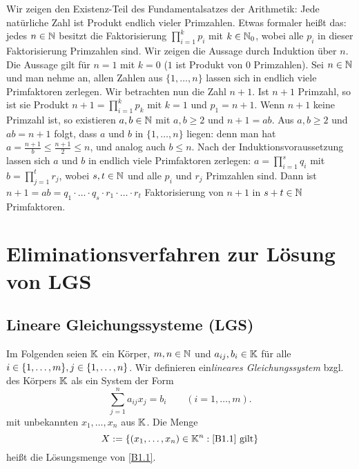 \begin{appendices}
\begin{bsp}
	Wir zeigen den Existenz-Teil des Fundamentalsatzes der Arithmetik: Jede natürliche Zahl ist Produkt endlich vieler Primzahlen.  Etwas formaler heißt das: jedes $n \in \mathbb N$ besitzt die Faktorisierung $\prod_{i=1}^k p_i$ mit $k \in \mathbb N_0$, wobei alle $p_i$ in dieser Faktorisierung Primzahlen sind. Wir zeigen die Aussage durch Induktion über $n$. Die Aussage gilt für $n=1$ mit $k=0$ ($1$ ist Produkt von $0$ Primzahlen). Sei $n \in \mathbb N$ und man nehme an, allen Zahlen aus $\{1,\ldots,n\}$ lassen sich in endlich viele Primfaktoren zerlegen. Wir betrachten nun die Zahl $n+1$. Ist $n+1$ Primzahl, so ist sie Produkt $n+ 1 = \prod_{i=1}^k p_k$ mit $k=1$ und $p_1=n+1$. Wenn $n+1$ keine Primzahl ist, so existieren $a, b \in \mathbb N$ mit $a, b \ge 2$ und $n+1 = ab$. Aus $a,b \ge 2$ und $ab = n+1$ folgt, dass $a$ und $b$ in $\{1,\ldots,n\}$ liegen: denn man hat $a = \frac{n+1}{b} \le \frac{n+1}{2} \le n$, und analog auch $b \le n$. Nach der Induktionsvoraussetzung lassen sich $a$ und $b$ in endlich viele Primfaktoren zerlegen: $a = \prod_{i=1}^s q_i$ mit $b = \prod_{j=1}^t r_j$, wobei $s, t\in \mathbb N$ und alle $p_i$ und $r_j$ Primzahlen sind. Dann ist $n+1 = ab = q_1 \cdot \ldots \cdot q_s \cdot r_1 \cdot \ldots \cdot r_t$ Faktorisierung von $n+1$ in $s+t \in \mathbb N$ Primfaktoren. 
\end{bsp} 

\section{Eliminationsverfahren zur Lösung von LGS}

\subsection{Lineare Gleichungssysteme (LGS)}

Im Folgenden seien $ \mathbb K $ ein Körper, $ m,n \in \mathbb N $ und $ a_{ij}, b_i \in \mathbb K $ für alle $ i \in \{ 1,\ldots,m \}, j \in \{ 1,\ldots,n \} $. Wir definieren ein\emph{lineares Gleichungssystem} bzgl. des Körpers $\mathbb K$ als ein System der Form
\begin{equation}
	\sum_{j=1}^{n} a_{ij} x_j = b_i \qquad  (i=1,\ldots,m). 
	\label{B1.1}
\end{equation}
mit unbekannten $ x_1, \ldots, x_n $ aus $ \mathbb K $. Die Menge
\begin{equation}
	X := \{(x_1, \ldots, x_n) \in \mathbb K^n : \text{\eqref{B1.1} gilt} \}
	\label{B1.2}
\end{equation}
heißt die Lösungsmenge von \eqref{B1.1}.


\end{appendices}
